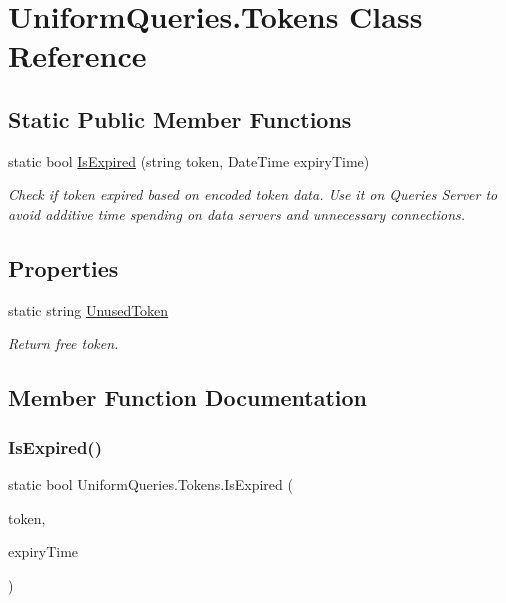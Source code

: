 \hypertarget{class_uniform_queries_1_1_tokens}{}\section{Uniform\+Queries.\+Tokens Class Reference}
\label{class_uniform_queries_1_1_tokens}
\subsection*{Static Public Member Functions}
\begin{DoxyCompactItemize}
\item 
static bool \mbox{\hyperlink{class_uniform_queries_1_1_tokens_a33a0ad42dfa560c4cfaac590a7924bd8}{Is\+Expired}} (string token, Date\+Time expiry\+Time)
\begin{DoxyCompactList}\small\item\em Check if token expired based on encoded token data. Use it on Queries Server to avoid additive time spending on data servers and unnecessary connections. \end{DoxyCompactList}\end{DoxyCompactItemize}
\subsection*{Properties}
\begin{DoxyCompactItemize}
\item 
static string \mbox{\hyperlink{class_uniform_queries_1_1_tokens_af591930ab4fa60ebdf27724f84ac7a91}{Unused\+Token}}
\begin{DoxyCompactList}\small\item\em Return free token. \end{DoxyCompactList}\end{DoxyCompactItemize}


\subsection{Member Function Documentation}
\mbox{\label{class_uniform_queries_1_1_tokens_a33a0ad42dfa560c4cfaac590a7924bd8}} 
\subsubsection{\texorpdfstring{Is\+Expired()}{IsExpired()}}
{\footnotesize\ttfamily static bool Uniform\+Queries.\+Tokens.\+Is\+Expired (\begin{DoxyParamCaption}\item[{string}]{token,  }\item[{Date\+Time}]{expiry\+Time }\end{DoxyParamCaption})\hspace{0.3cm}{\ttfamily [static]}}



